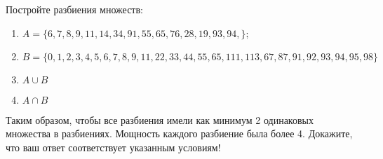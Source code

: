 \question
Постройте разбиения множеств:
\begin{enumerate}
	\renewcommand{\labelenumi}{\alph{enumi})}
	\item $A = \{6, 7, 8, 9, 11, 14, 34, 91, 55, 65, 76, 28, 19, 93, 94, \};$
	\item $B = \{0, 1, 2, 3, 4, 5, 6, 7, 8, 9, 11, 22, 33, 44, 55, 65, 111, 113, 67, 87, 91, 92, 93, 94, 95, 98\}$
	\item $A \cup B$
	\item $A \cap B$
\end{enumerate}
Таким образом, чтобы все разбиения имели как минимум 2 одинаковых множества в разбиениях.
Мощность каждого разбиение была более 4.
Докажите, что ваш ответ соответствует указанным условиям!
